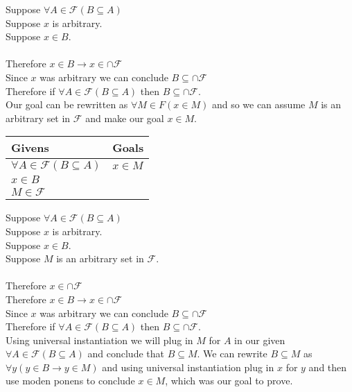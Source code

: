 \documentclass{article}
\newcommand{\n}{ \noindent }
\newcommand{\F}{\mathcal{F}}
\begin{document}
\n Suppose $\forall A \in \F(B \subseteq A)$ \\
\indent Suppose $x$ is arbitrary. \\
\indent \indent Suppose $x \in B$. \\
\indent \indent \indent [proof of $x \in \cap \F$] \\
\indent \indent Therefore $x \in B \rightarrow x \in \cap \F$ \\
\indent Since $x$ was arbitrary we can conclude $B \subseteq \cap \F$ \\
\n Therefore if $\forall A \in \F(B \subseteq A)$ then $B \subseteq \cap \F$. \\

\n Our goal can be rewritten as $\forall M \in F(x \in M)$ and so we can assume $M$ is an arbitrary set in $\F$ and make our goal $x \in M$.\\


\begin{table}[h]
\begin{tabular}{ll}
\hline
Givens & Goals   \\ \hline
$\forall A \in \F(B \subseteq A)$  & $x \in M$   \\ 
$x \in B$ & \\
$M \in \F$ & \\ \hline
\end{tabular}
\end{table}

\n Suppose $\forall A \in \F(B \subseteq A)$ \\
\indent Suppose $x$ is arbitrary. \\
\indent \indent Suppose $x \in B$. \\
\indent \indent \indent Suppose $M$ is an arbitrary set in $\F$. \\
\indent \indent \indent \indent [proof of $x \in M$] \\
\indent \indent \indent Therefore $x \in \cap \F$ \\
\indent \indent Therefore $x \in B \rightarrow x \in \cap \F$ \\
\indent Since $x$ was arbitrary we can conclude $B \subseteq \cap \F$ \\
\n Therefore if $\forall A \in \F(B \subseteq A)$ then $B \subseteq \cap \F$. \\

\n Using universal instantiation we will plug in $M$ for $A$ in our given $\forall A \in \F(B \subseteq A)$ and conclude that $B \subseteq M$. We can rewrite $B \subseteq M$ as $\forall y(y \in B \rightarrow y \in M)$ and using universal instantiation plug in $x$ for $y$ and then use moden ponens to conclude $x \in M$, which was our goal to prove.
\end{document}
